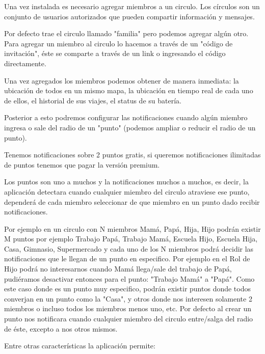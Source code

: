 Una vez instalada es necesario agregar miembros a un circulo. Los círculos son un conjunto de usuarios autorizados que pueden compartir información y mensajes. 

Por defecto trae el circulo llamado "familia" pero podemos agregar algún otro. Para agregar un miembro al circulo lo hacemos a través de un "código de invitación", éste se comparte a través de un link o ingresando el código directamente. 

Una vez agregados los miembros podemos obtener de manera inmediata: la ubicación de todos en un mismo mapa, la ubicación en tiempo real de cada uno de ellos, el historial de sus viajes, el status de su batería.

Posterior a esto podremos configurar las notificaciones cuando algún miembro ingresa o sale del radio de un "punto" (podemos ampliar o reducir el radio de un punto). 

Tenemos notificaciones sobre 2 puntos gratis, si queremos notificaciones ilimitadas de puntos tenemos que pagar la versión premium.

Los puntos son uno a muchos y la notificaciones muchos a muchos, es decir, la aplicación detectara cuando cualquier miembro del circulo atraviese ese punto, dependerá de cada miembro seleccionar de que miembro en un punto dado recibir notificaciones.

Por ejemplo en un circulo con N miembros {Mamá, Papá, Hija, Hijo} podrán existir M puntos por ejemplo {Trabajo Papá, Trabajo Mamá, Escuela Hijo, Escuela Hija, Casa, Gimnasio, Supermercado} y cada uno de los N miembros podrá decidir las notificaciones que le llegan de un punto en especifico. Por ejemplo en el Rol de Hijo podrá no interesarnos cuando Mamá llega/sale del trabajo de Papá, pudiéramos desactivar entonces para el punto: "Trabajo Mamá" a "Papá". Como este caso donde es un punto muy especifico, podrán existir puntos donde todos converjan en un punto como la "Casa", y otros donde nos interesen solamente 2 miembros o incluso todos los miembros menos uno, etc. Por defecto al crear un punto nos notificara cuando cualquier miembro del circulo entre/salga del radio de éste, excepto a nos otros mismos.

Entre otras características la aplicación permite:

